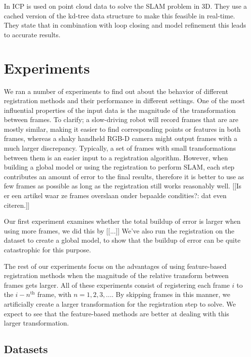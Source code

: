 \documentclass[a4paper]{article}
\begin{document}
In \cite{nuchter20076d} \ac{ICP} is used on point cloud data to solve the \ac{SLAM} problem in 3D. They use a cached version of the kd-tree data structure to make this feasible in real-time. They state that in combination with loop closing and model refinement this leads to accurate results.

\section{Experiments}

We ran a number of experiments to find out about the behavior of different registration methods and their performance in different settings. One of the most influential properties of the input data is the magnitude of the transformation between frames. To clarify; a slow-driving robot will record frames that are are mostly similar, making it easier to find corresponding points or features in both frames, whereas a shaky handheld RGB-D camera might output frames with a much larger discrepancy. Typically, a set of frames with small transformations between them is an easier input to a registration algorithm. However, when building a global model or using the registration to perform SLAM, each step contributes an amount of error to the final results, therefore it is better to use as few frames as possible as long as the registration still works reasonably well. [[Is er een artikel waar ze frames overslaan onder bepaalde condities?: dat even citeren.]]

Our first experiment examines whether the total buildup of error is larger when using more frames, we did this by [[...]] We've also run the registration on the dataset to create a global model, to show that the buildup of error can be quite catastrophic for this purpose.

The rest of our experiments focus on the advantages of using feature-based registration methods when the magnitude of the relative transform between frames gets larger. All of these experiments consist of registering each frame $i$ to the $i-n^{\mathrm{th}}$ frame, with $n = 1,2,3,...$. By skipping frames in this manner, we artificially create a larger transformation for the registration step to solve. We expect to see that the feature-based methods are better at dealing with this larger transformation.

\subsection{Datasets}
\end{document}

